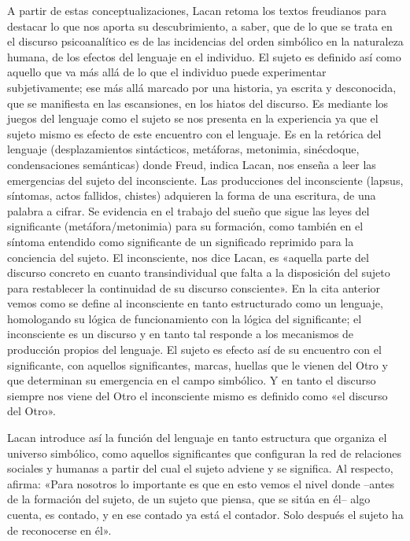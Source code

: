 A partir de estas conceptualizaciones, Lacan retoma los textos freudianos para destacar lo que nos aporta su descubrimiento, a saber, que de lo que se trata en el discurso psicoanalítico es de las incidencias del orden simbólico en la naturaleza humana, de los efectos del lenguaje en el individuo. El sujeto es definido así como aquello que va más allá de lo que el individuo puede experimentar subjetivamente; ese más allá marcado por una historia, ya escrita y desconocida, que se manifiesta en las escansiones, en los hiatos del discurso. Es mediante los juegos del lenguaje como el sujeto se nos presenta en la experiencia ya que el sujeto mismo es efecto de este encuentro con el lenguaje. Es en la retórica del lenguaje (desplazamientos sintácticos, metáforas, metonimia, sinécdoque, condensaciones semánticas) donde Freud, indica Lacan, nos enseña a leer las emergencias del sujeto del inconsciente. Las producciones del inconsciente (lapsus, síntomas, actos fallidos, chistes) adquieren la forma de una escritura, de una palabra a cifrar. Se evidencia en el trabajo del sueño que sigue las leyes del significante (metáfora/metonimia) para su formación, como también en el síntoma entendido como significante de un significado reprimido para la conciencia del sujeto. El inconsciente, nos dice Lacan, es «aquella parte del discurso concreto en cuanto transindividual que falta a la disposición del sujeto para restablecer la continuidad de su discurso consciente». En la cita anterior vemos como se define al inconsciente en tanto estructurado como un lenguaje, homologando su lógica de funcionamiento con la lógica del significante; el inconsciente es un discurso y en tanto tal responde a los mecanismos de producción propios del lenguaje. El sujeto es efecto así de su encuentro con el significante, con aquellos significantes, marcas, huellas que le vienen del Otro y que determinan su emergencia en el campo simbólico. Y en tanto el discurso siempre nos viene del Otro el inconsciente mismo es definido como «el discurso del Otro».

Lacan introduce así la función del lenguaje en tanto estructura que organiza el universo simbólico, como aquellos significantes que configuran la red de relaciones sociales y humanas a partir del cual el sujeto adviene y se significa. Al respecto, afirma: «Para nosotros lo importante es que en esto vemos el nivel donde --antes de la formación del sujeto, de un sujeto que piensa, que se sitúa en él-- algo cuenta, es contado, y en ese contado ya está el contador. Solo después el sujeto ha de reconocerse en él».

